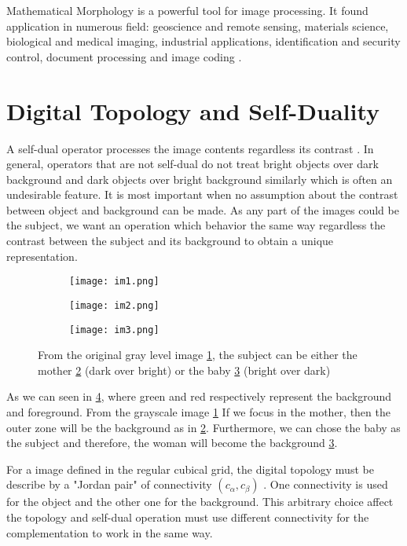 \par Mathematical Morphology is a powerful tool for image processing. It found application in numerous field: geoscience and remote sensing, materials science, biological and medical imaging, industrial applications, identification and security control, document processing and image coding \cite{Soille:2003:MIA:773286}.


\section{Digital Topology and Self-Duality}

A self-dual operator processes the image contents regardless its contrast \cite{Geraud.15.ismm}. In general, operators that are not self-dual do not treat bright objects over dark background and dark objects over bright background similarly which is often an undesirable feature. It is most important when no assumption about the contrast between object and background can be made. As any part of the images could be the subject, we want an operation which behavior the same way regardless the contrast between the subject and its background to obtain a unique representation.  
\begin{figure}

	\begin{subfigure}{0.3\textwidth}
	 	\texttt{[image: im1.png]} \caption{}\label{fig:gray} \end{subfigure}
	\begin{subfigure}{0.3\textwidth}
		\texttt{[image: im2.png]} \caption{}\label{fig:mother} \end{subfigure}
	\begin{subfigure}{0.3\textwidth}
		\texttt{[image: im3.png]} \caption{}\label{fig:baby} \end{subfigure}
	\centering
	\caption[Example of \textit{subjects}] {From the original gray level image \ref{fig:gray}, the subject can be either the mother \ref{fig:mother} (dark over bright) or the baby \ref{fig:baby} (bright over dark) }
	\label{fig:motheAndBaby}
\end{figure}

\par
As we can seen in \ref{fig:motheAndBaby}, where green and red respectively represent the background and foreground. From the grayscale image \ref{fig:gray} If we focus in the mother, then the outer zone will be the background as in \ref{fig:mother}. Furthermore, we can chose the baby as the subject and therefore, the woman will become the background \ref{fig:baby}.	
\par
For a image defined in the regular cubical grid, the digital topology must be describe by a "Jordan pair" of connectivity $(c_\alpha,c_\beta)$ \cite{Kong:1989:DTI:71397.71400}. One connectivity is used for the object and the other one for the background. This arbitrary choice affect the topology and self-dual operation must use different connectivity for the complementation to work in the same way.




